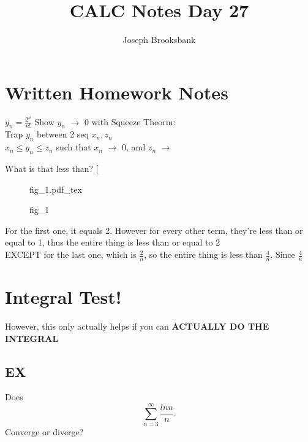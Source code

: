 \documentclass[12pt]{article}
\title{CALC Notes Day 27}
\author{Joseph Brooksbank}
\newcommand{\incfig}[1]{%
    \def\svgwidth{\columnwidth}
    {#1.pdf_tex}
}
\begin{document}
\maketitle

\section*{Written Homework Notes}
$y_n = \frac{2^{n}}{n!}$
Show $y_n$ $\to$ 0 with Squeeze Theorm:
\\
Trap $y_n$ between 2 seq $x_n, z_n$ \\ $x_n \leq y_n \leq z_n$ such that $x_n$ $\to$ 0, and $z_n$ $\to$

What is that less than?
[
\begin{figure}[ht]
    \centering
    \incfig{fig_1}
    \caption{fig_1}
    \label{fig:fig_1}
\end{figure}

For the first one, it equals 2. However for every other term, they're less than or equal to 1, thus the entire thing is less than or equal to 2 
\\
EXCEPT for the last one, which is $\frac{2}{n}$, so the entire thing is less than $\frac{4}{n}$. Since $\frac{4}{n}$

\section*{Integral Test!}

However, this only actually helps if you can \textbf{ACTUALLY DO THE INTEGRAL} 

\subsection*{EX}
Does 
\[
\sum_{n=3}^{\infty} \frac{ln n}{n}
.\] Converge or diverge?
\end{document}
